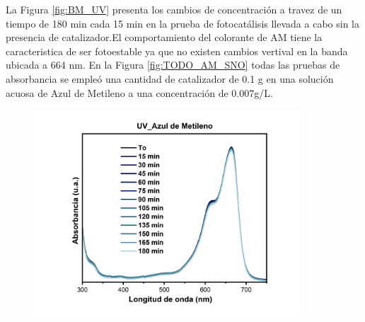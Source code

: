 \documentclass[12pt]{article}
\begin{document}
La Figura \ref{fig:BM_UV} presenta los cambios de concentración a travez de un tiempo de 180 min cada 15 min en la prueba de fotocatálisis llevada a cabo sin la presencia de catalizador.El comportamiento del colorante de AM tiene la caracteristica de ser fotoestable ya que no existen cambios vertival en la banda ubicada a 664 nm.
En la Figura \ref{fig:TODO_AM_SNO} todas las pruebas de absorbancia se empleó una cantidad de catalizador de 0.1 g en una solución acuosa de Azul de Metileno a una concentración de 0.007g/L. 
\begin{figure}[H]
    	   \begin{center}
     	  	\includegraphics[width = 0.9\textwidth]{Imagenes/MB/BM_UV_Color.png}
    	   \end{center} 
        \end{figure}
\end{document}
